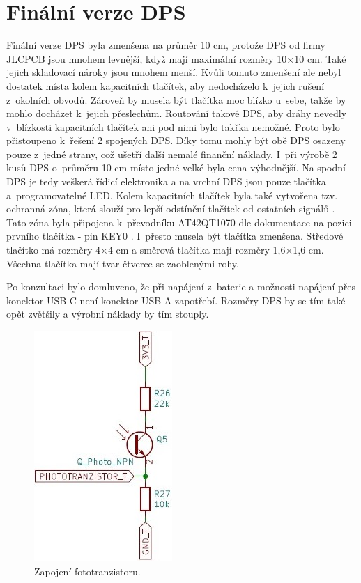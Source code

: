 \chapter{Finální verze DPS}
Finální verze DPS byla zmenšena na průměr 10 cm, protože DPS od firmy JLCPCB jsou mnohem levnější, když mají maximální rozměry 10$\times$10 cm. Také jejich skladovací nároky jsou mnohem  menší. 
Kvůli tomuto zmenšení ale nebyl dostatek místa 
kolem kapacitních tlačítek, aby nedocházelo k~jejich rušení z~okolních obvodů. Zároveň by musela být tlačítka moc blízko u~sebe, takže by mohlo docházet k~jejich přeslechům. Routování takové 
DPS, aby dráhy nevedly v~blízkosti kapacitních tlačítek ani pod nimi bylo takřka nemožné. Proto bylo přistoupeno k~řešení 2 spojených DPS. Díky tomu mohly být obě DPS osazeny pouze z~jedné strany,
což ušetří další nemalé finanční náklady. I~při výrobě 2 kusů DPS o~průměru 10 cm místo jedné velké byla cena výhodnější. Na spodní DPS je tedy veškerá řídicí elektronika a na vrchní DPS jsou pouze tlačítka 
a~programovatelné LED. Kolem kapacitních tlačítek byla také vytvořena tzv. ochranná zóna, která slouží pro lepší odstínění tlačítek od ostatních signálů \cite{conv_cap_but_AT42QT1070_dtsh}. Tato zóna 
byla připojena k~převodníku AT42QT1070 dle dokumentace na pozici prvního tlačítka - pin KEY0 \cite{conv_cap_but_AT42QT1070_dtsh}. I~přesto musela být tlačítka zmenšena. Středové tlačítko má rozměry 
4$\times$4 cm a směrová tlačítka mají rozměry 1,6$\times$1,6 cm. Všechna tlačítka mají tvar čtverce se zaoblenými rohy. 

Po konzultaci bylo domluveno, že při napájení z~baterie a možnosti napájení přes konektor USB-C není konektor USB-A zapotřebí. Rozměry DPS by se tím také opět zvětšily a výrobní náklady by tím 
stouply. 

\begin{figure}[!h]
  \begin{center}
    \includegraphics[scale=0.7]{obrazky/fototranzistor.jpg}
  \end{center}
  \caption[Zapojení fototranzistoru]{Zapojení fototranzistoru.}
\end{figure}

